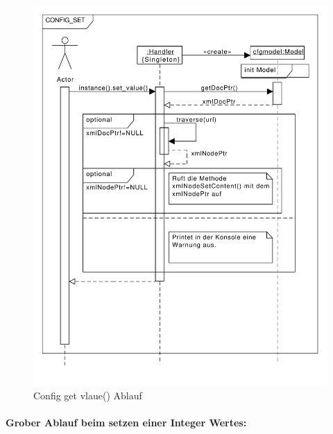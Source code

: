 \begin{figure}[htb!]
    \centering
    \includegraphics[scale=0.5]{./gfx/seq/config_set}
    \caption{Config get vlaue() Ablauf}
    \label{c_configget}
\end{figure}

\newpage
\paragraph{Grober Ablauf beim setzen einer Integer Wertes:}

